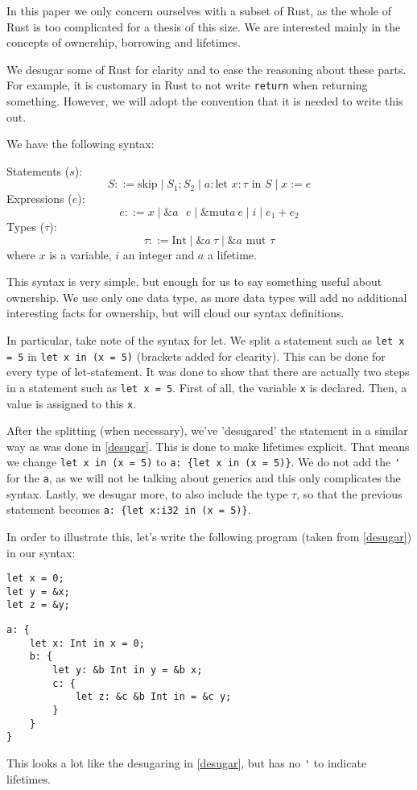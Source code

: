 In this paper we only concern ourselves with a subset of Rust, as the whole of Rust is too complicated for a thesis of this size. We are interested mainly in the concepts of ownership, borrowing and lifetimes. 

We desugar some of Rust for clarity and to ease the reasoning about these parts. For example, it is customary in Rust to not write \verb|return| when returning something. However, we will adopt the convention that it is needed to write this out. 

We have the following syntax: 

Statements ($s$):
$$S ::= \textrm{skip} \mid S_1; S_2 \mid a: \textrm{let } x:\tau \textrm{ in } S \mid x := e$$
Expressions ($e$):
$$e ::= x \mid \&a\textrm{ }e \mid \&\textrm{mut}a ~e \mid i \mid e_1 + e_2$$ 
Types ($\tau$): 
$$\tau ::= \textrm{Int} \mid \&a ~\tau \mid \&a \textrm{ mut } \tau$$
where $x$ is a variable, $i$ an integer and $a$ a lifetime. 

This syntax is very simple, but enough for us to say something useful about ownership. We use only one data type, as more data types will add no additional interesting facts for ownership, but will cloud our syntax definitions. 

In particular, take note of the syntax for let. We split a statement such as \verb|let x = 5| in \verb|let x in (x = 5)| (brackets added for clearity). This can be done for every type of let-statement. It was done to show that there are actually two steps in a statement such as \verb|let x = 5|. First of all, the variable \verb|x| is declared. Then, a value is assigned to this \verb|x|. 

After the splitting (when necessary), we've 'desugared' the statement in a similar way as was done in \ref{desugar}. This is done to make lifetimes explicit. That means we change \verb|let x in (x = 5)| to \verb|a: {let x in (x = 5)}|. We do not add the \verb|'| for the \verb|a|, as we will not be talking about generics and this only complicates the syntax. Lastly, we desugar more, to also include the type $\tau$, so that the previous statement becomes \verb|a: {let x:i32 in (x = 5)}|. 

In order to illustrate this, let's write the following program (taken from \ref{desugar}) in our syntax: 

\begin{verbatim}
let x = 0;
let y = &x;
let z = &y;
\end{verbatim}

\begin{verbatim}
a: {
    let x: Int in x = 0;
    b: {
        let y: &b Int in y = &b x;
        c: {
            let z: &c &b Int in = &c y;
        }
    }
}
\end{verbatim}

This looks a lot like the desugaring in \ref{desugar}, but has no \verb|'| to indicate lifetimes. 